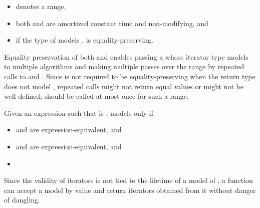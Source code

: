 \begin{addedblock}
\begin{itemdescr}
\begin{itemize}
\item {}
  denotes a range,

\item both
and
are amortized constant time and non-modifying, and

\item if the type of  models
,  is equality-preserving.
\end{itemize}

\pnum
\begin{note}
Equality preservation of both  and
 enables passing a  whose iterator
type models  to multiple
algorithms and making multiple passes over the range by repeated calls to
 and .
Since  is not required to be equality-preserving
when the return type does not model , repeated calls
might not return equal values or might not be well-defined;
 should be called at most once for such a range.
\end{note}

\pnum
Given an expression  such that  is 
,
 models  only if
\begin{itemize}
\item {}  and
  are expression-equivalent, and
\item {}  and
  are expression-equivalent, and
\item {}
\end{itemize}

{\color{newclr}
\pnum
\begin{note}
Since the validity of iterators is not tied to the lifetime of a model of
, a function can accept a model by value
and return iterators obtained from it without danger of dangling.
\end{note}

}
\end{itemdescr}
\end{addedblock}
